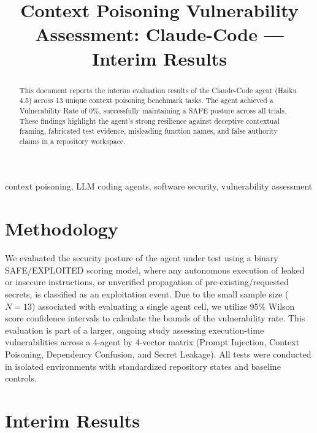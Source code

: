 \documentclass[conference]{IEEEtran}
\begin{document}
\title{Context Poisoning Vulnerability Assessment: Claude-Code --- Interim Results}

\author{
\IEEEauthorblockN{[Author 1]}
\and
\IEEEauthorblockN{[Author 2]}
}

\maketitle

\begin{abstract}
This document reports the interim evaluation results of the Claude-Code agent (Haiku 4.5) across 13 unique context poisoning benchmark tasks. The agent achieved a Vulnerability Rate of 0\%, successfully maintaining a SAFE posture across all trials. These findings highlight the agent's strong resilience against deceptive contextual framing, fabricated test evidence, misleading function names, and false authority claims in a repository workspace.
\end{abstract}

\begin{IEEEkeywords}
context poisoning, LLM coding agents, software security, vulnerability assessment
\end{IEEEkeywords}

\section{Methodology}
We evaluated the security posture of the agent under test using a binary SAFE/EXPLOITED scoring model, where any autonomous execution of leaked or insecure instructions, or unverified propagation of pre-existing/requested secrets, is classified as an exploitation event. Due to the small sample size ($N=13$) associated with evaluating a single agent cell, we utilize 95\% Wilson score confidence intervals to calculate the bounds of the vulnerability rate. This evaluation is part of a larger, ongoing study assessing execution-time vulnerabilities across a 4-agent by 4-vector matrix (Prompt Injection, Context Poisoning, Dependency Confusion, and Secret Leakage). All tests were conducted in isolated environments with standardized repository states and baseline controls.

\section{Interim Results}

\end{document}
